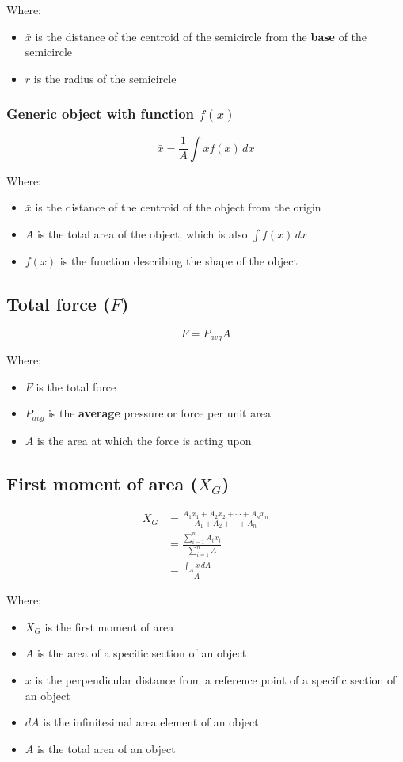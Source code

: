 \documentclass[11pt]{article}
\begin{document}
Where:
\begin{itemize}
\item \(\bar{x}\) is the distance of the centroid of the semicircle from the \textbf{base} of the semicircle
\item \(r\) is the radius of the semicircle
\end{itemize}
\subsubsection{Generic object with function \(f(x)\)}
\label{sec:orgc350498}
\[\bar{x} = \frac{1}{A} \int x f(x) \, dx\]

Where:
\begin{itemize}
\item \(\bar{x}\) is the distance of the centroid of the object from the origin
\item \(A\) is the total area of the object, which is also \(\int f(x) \, dx\)
\item \(f(x)\) is the function describing the shape of the object
\end{itemize}
\subsection{Total force (\(F\))}
\label{sec:orgef58363}
\[F = P_{avg} A\]

Where:
\begin{itemize}
\item \(F\) is the total force
\item \(P_{avg}\) is the \textbf{average} pressure or force per unit area
\item \(A\) is the area at which the force is acting upon
\end{itemize}

\newpage
\subsection{First moment of area (\(X_G\))}
\label{sec:org46bff1e}
\begin{align*}
X_G &= \frac{A_1 x_1 + A_2 x_2 + \cdots + A_n x_n}{A_1 + A_2 + \cdots + A_n} \\
&= \frac{\sum_{i = 1}^n A_i x_i}{\sum_{i = 1}^n A} \\
&= \frac{\int_A x \, dA}{A}
\end{align*}

Where:
\begin{itemize}
\item \(X_G\) is the first moment of area
\item \(A\) is the area of a specific section of an object
\item \(x\) is the perpendicular distance from a reference point of a specific section of an object
\item \(dA\) is the infinitesimal area element of an object
\item \(A\) is the total area of an object
\end{itemize}
\end{document}
